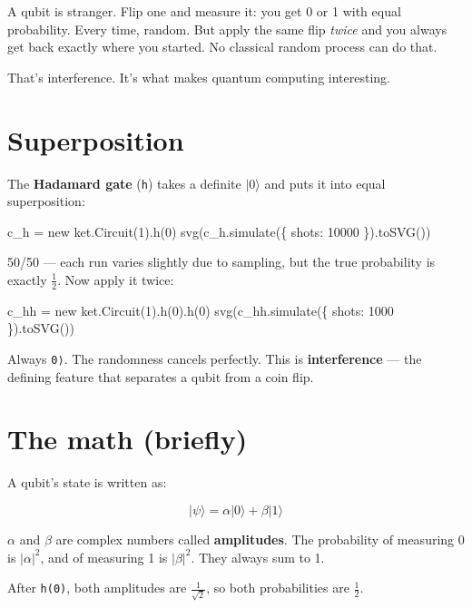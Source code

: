 \documentclass[
  11pt,
  letterpaper,
  oneside]{scrbook}
\newenvironment{Shaded}{\begin{snugshade}}{\end{snugshade}}
\newcommand{\NormalTok}[1]{\textcolor[rgb]{0.00,0.23,0.31}{#1}}
\begin{document}
A qubit is stranger. Flip one and measure it: you get 0 or 1 with equal
probability. Every time, random. But apply the same flip \emph{twice}
and you always get back exactly where you started. No classical random
process can do that.

That's interference. It's what makes quantum computing interesting.

\section{Superposition}\label{superposition}

The \textbf{Hadamard gate} (\texttt{h}) takes a definite \(|0\rangle\)
and puts it into equal superposition:

\begin{Shaded}
\begin{Highlighting}[]
\NormalTok{c\_h = new ket.Circuit(1).h(0)}
\NormalTok{svg(c\_h.simulate(\{ shots: 10000 \}).toSVG())}
\end{Highlighting}
\end{Shaded}

50/50 --- each run varies slightly due to sampling, but the true
probability is exactly \(\frac{1}{2}\). Now apply it twice:

\begin{Shaded}
\begin{Highlighting}[]
\NormalTok{c\_hh = new ket.Circuit(1).h(0).h(0)}
\NormalTok{svg(c\_hh.simulate(\{ shots: 1000 \}).toSVG())}
\end{Highlighting}
\end{Shaded}

Always \texttt{\textbar{}0⟩}. The randomness cancels perfectly. This is
\textbf{interference} --- the defining feature that separates a qubit
from a coin flip.

\section{The math (briefly)}\label{the-math-briefly}

A qubit's state is written as:

\[|\psi\rangle = \alpha|0\rangle + \beta|1\rangle\]

\(\alpha\) and \(\beta\) are complex numbers called \textbf{amplitudes}.
The probability of measuring 0 is \(|\alpha|^2\), and of measuring 1 is
\(|\beta|^2\). They always sum to 1.

After \texttt{h(0)}, both amplitudes are \(\frac{1}{\sqrt{2}}\), so both
probabilities are \(\frac{1}{2}\).
\end{document}
